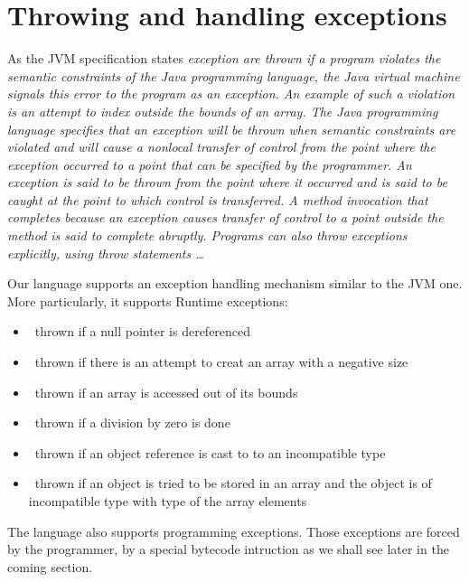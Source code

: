 
\section{Throwing and handling exceptions}\label{opSem:exc}

As the JVM specification states \textit{exception are thrown if a program violates the semantic constraints of the Java programming language,
 the Java virtual machine signals this error to the program as an exception. An example of such a violation is an 
attempt to index outside the bounds of an array. The Java programming language specifies that an exception will be thrown when
 semantic constraints are violated and will cause a nonlocal transfer of control from the point where the exception occurred to
 a point that can be specified by the programmer. An exception is said to be thrown from the point where it occurred and is said to be
 caught at the point to which control is transferred. A method invocation that completes because an exception causes transfer of
 control to a point outside the method is said to complete abruptly. Programs can also throw exceptions explicitly, using throw statements \ldots }

Our language supports an exception handling mechanism similar to the JVM one.
 More particularly, it supports  Runtime exceptions: 
 \begin{itemize}
   \item \NullPointerExc \ thrown if a null pointer is dereferenced
   \item \NegativeArraySizeExc \ thrown if there is an attempt to creat  an array with a negative size 
   \item \ArrIndexOutOfBoundExc \ thrown if an array is accessed out of its bounds
   \item \ArithExc \ thrown if a division by zero is done
   \item \ClassCastExc \ thrown if an object reference is cast to to an incompatible type
   \item \ArrStoreExc \ thrown if an object is tried to be stored in an array and the object is of incompatible type with type of the  array elements
\end{itemize}

The language also supports programming exceptions. Those exceptions are forced by the programmer, by a special bytecode 
intruction as we shall see later in the coming section. 

